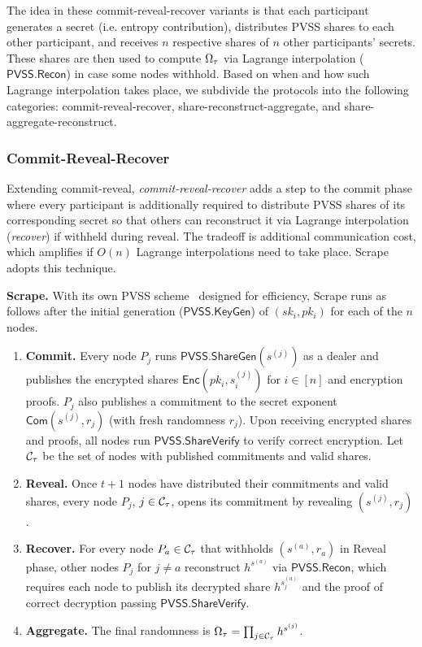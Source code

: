 The idea in these commit-reveal-recover variants is that each participant generates a secret (i.e. entropy contribution), distributes PVSS shares to each other participant, and receives $n$ respective shares of $n$ other participants' secrets. These shares are then used to compute $\Omega_\tau$ via Lagrange interpolation ($\mathsf{PVSS.Recon}$) in case some nodes withhold. Based on when and how such Lagrange interpolation takes place, we subdivide the protocols into the following categories: commit-reveal-recover, share-reconstruct-aggregate, and share-aggregate-reconstruct.

\subsubsection{Commit-Reveal-Recover}
Extending commit-reveal, \textit{commit-reveal-recover} adds a step to the commit phase where every participant is additionally required to distribute PVSS shares of its corresponding secret so that others can reconstruct it via Lagrange interpolation (\textit{recover}) if withheld during reveal. The tradeoff is additional communication cost, which amplifies if $O(n)$ Lagrange interpolations need to take place. Scrape~\cite{cascudo2017scrape} adopts this technique.

\noindent\textbf{Scrape.} With its own PVSS scheme~\cite{cascudo2017scrape} designed for efficiency, Scrape runs as follows after the initial generation ($\mathsf{PVSS.KeyGen}$) of $(sk_i, pk_i)$ for each of the $n$ nodes.
\begin{enumerate}
\item \textbf{Commit.} Every node $P_j$ runs $\mathsf{PVSS.ShareGen}(s^{(j)})$ as a dealer and publishes the encrypted shares $\mathsf{Enc}(pk_i, s^{(j)}_i)$ for $i \in [n]$ and encryption proofs. $P_j$ also publishes a commitment to the secret exponent $\mathsf{Com}(s^{(j)}, r_j)$ (with fresh randomness $r_j$). Upon receiving encrypted shares and proofs, all nodes run $\mathsf{PVSS.ShareVerify}$ to verify correct encryption. Let $\mathcal{C}_\tau$ be the set of nodes with published commitments and valid shares.
\item \textbf{Reveal.} Once $t + 1$ nodes have distributed their commitments and valid shares, every node $P_j$, $j \in \mathcal{C}_\tau$, opens its commitment by revealing $(s^{(j)}, r_j)$.
\item \textbf{Recover.} For every node $P_a \in \mathcal{C}_\tau$ that withholds $(s^{(a)}, r_a)$ in Reveal phase, other nodes $P_j$ for $j \neq a$ reconstruct $h^{s^{(a)}}$ via $\mathsf{PVSS.Recon}$, which requires each node to publish its decrypted share $h^{s_j^{(a)}}$ and the proof of correct decryption passing $\mathsf{PVSS.ShareVerify}$.
\item \textbf{Aggregate.} The final randomness is $\Omega_\tau = \prod_{j \in \mathcal{C}_\tau} h^{s^{(j)}}$.
\end{enumerate}

